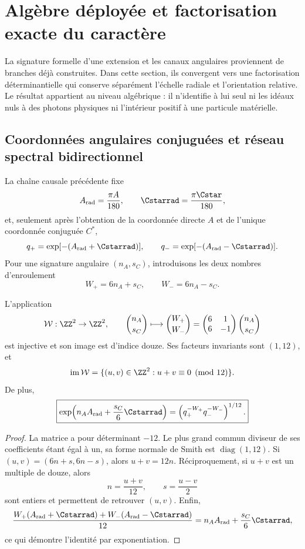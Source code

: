 \chapter{Algèbre déployée et factorisation exacte du caractère}
\label{chap:factorizacion-split}

La signature formelle d'une extension et les canaux angulaires proviennent de branches déjà construites. Dans cette section, ils convergent vers une factorisation déterminantielle qui conserve séparément l'échelle radiale et l'orientation relative. Le résultat appartient au niveau algébrique : il n'identifie à lui seul ni les idéaux nuls à des photons physiques ni l'intérieur positif à une particule matérielle.

\section{Coordonnées angulaires conjuguées et réseau spectral bidirectionnel}
\label{sec:reticula-angular-split}

La chaîne causale précédente fixe
\[
 A_{\rm rad}=\frac{\pi A}{180},\qquad
 \Cstarrad=\frac{\pi\Cstar}{180},
\]
et, seulement après l'obtention de la coordonnée directe \(A\) et de l'unique coordonnée conjuguée \(C^*\),
\[
 q_+=\exp[-(A_{\rm rad}+\Cstarrad)],
 \qquad
 q_-=\exp[-(A_{\rm rad}-\Cstarrad)].
\]
Pour une signature angulaire \((n_A,s_C)\), introduisons les deux nombres d'enroulement
\[
 W_+=6n_A+s_C,
 \qquad
 W_-=6n_A-s_C.
\]

\begin{theorem}
\label{thm:reticula-two-way}
L'application
\[
 \mathcal W:\ZZ^2\to\ZZ^2,
 \qquad
 \binom{n_A}{s_C}\longmapsto
 \binom{W_+}{W_-}
 =\begin{pmatrix}6&1\\6&-1\end{pmatrix}
 \binom{n_A}{s_C}
\]
est injective et son image est d'indice douze. Ses facteurs invariants sont \((1,12)\), et
\[
 \operatorname{im}\mathcal W
 =\{(u,v)\in\ZZ^2:u+v\equiv0\pmod{12}\}.
\]
De plus,
\[
 \boxed{
 \exp\!\left(n_AA_{\rm rad}+\frac{s_C}{6}\Cstarrad\right)
 =\left(q_+^{-W_+}q_-^{-W_-}\right)^{1/12}.}
\]
\end{theorem}

\begin{proof}
La matrice a pour déterminant \(-12\). Le plus grand commun diviseur de ses coefficients étant égal à un, sa forme normale de Smith est \(\operatorname{diag}(1,12)\). Si \((u,v)=(6n+s,6n-s)\), alors \(u+v=12n\). Réciproquement, si \(u+v\) est un multiple de douze, alors
\[
 n=\frac{u+v}{12},
 \qquad
 s=\frac{u-v}{2}
\]
sont entiers et permettent de retrouver \((u,v)\). Enfin,
\[
 \frac{W_+(A_{\rm rad}+\Cstarrad)
       +W_-(A_{\rm rad}-\Cstarrad)}{12}
 =n_AA_{\rm rad}+\frac{s_C}{6}\Cstarrad,
\]
ce qui démontre l'identité par exponentiation.
\end{proof}

